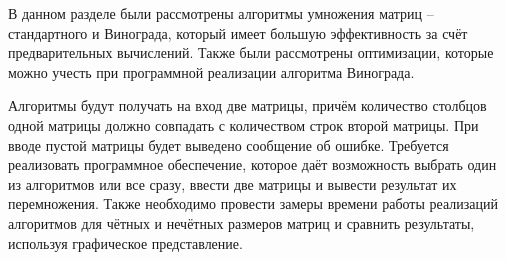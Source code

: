 В данном разделе были рассмотрены алгоритмы умножения матриц -- стандартного и Винограда, который имеет большую эффективность за счёт предварительных вычислений. 
Также были рассмотрены оптимизации, которые можно учесть при программной реализации алгоритма Винограда.

Алгоритмы будут получать на вход две матрицы, причём количество столбцов одной матрицы должно совпадать с количеством строк второй матрицы. 
При вводе пустой матрицы будет выведено сообщение об ошибке. 
Требуется реализовать программное обеспечение, которое даёт возможность выбрать один из алгоритмов или все сразу, ввести две матрицы и вывести результат их перемножения.
Также необходимо провести замеры времени работы реализаций алгоритмов для чётных и нечётных размеров матриц и сравнить результаты, используя графическое представление.
